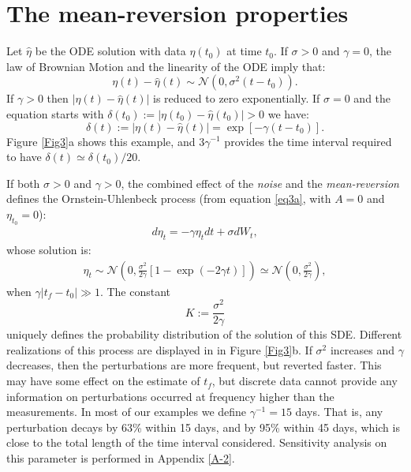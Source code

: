 \documentclass{article}
\begin{document}
\section{The mean-reversion properties}
Let $\hat\eta$ be the ODE solution with data $\eta(t_0)$ at time $t_0$. If $\sigma>0$ and $\gamma=0$, the law of Brownian Motion and the linearity of the ODE imply that:
$$\eta(t)-\hat\eta(t)\sim \mathcal N\left(0,\sigma^2(t-t_0)\right).$$
If $\gamma>0$ then $\left|\eta(t)-\hat\eta(t)\right|$ is reduced to zero exponentially. If $\sigma=0$ and the equation starts with $\delta(t_0):=|\eta(t_0)-\hat\eta(t_0)|>0$ we have:
$$\delta(t):=\left|\eta(t)-\hat\eta(t)\right|=\exp[-\gamma(t-t_0)].$$
Figure \ref{Fig3}a shows this example, and $3\gamma^{-1}$ provides the time interval required to have $\delta(t)\simeq\delta(t_0)/20$.

If both $\sigma>0$ and $\gamma>0$, the combined effect of the {\it noise} and the {\it mean-reversion} defines the Ornstein-Uhlenbeck process (from equation \ref{eq3a}, with $A=0$ and $\eta_{t_0}=0$):
\begin{align}\label{eq4a}
d\eta_t=-\gamma\eta_t dt+\sigma dW_t,
\end{align}
whose solution is:
\begin{align}\label{eq4b}
\eta_t\sim\mathcal N\left(0,\frac{\sigma^2}{2\gamma}\left[1-\exp(-2\gamma t)\right]\right)\simeq \mathcal N\left(0,\frac{\sigma^2}{2\gamma}\right),
\end{align}
when $\gamma|t_f-t_0|\gg1$. The constant
$$K:=\frac{\sigma^2}{2\gamma}$$
uniquely defines the probability distribution of the solution of this SDE. Different realizations of this process are displayed in in Figure \ref{Fig3}b. If $\sigma^2$ increases and $\gamma$ decreases, then the perturbations are more frequent, but reverted faster. This may have some effect on the estimate of $t_f$, but discrete data cannot provide any information on perturbations occurred at frequency higher than the measurements. In most of our examples we define $\gamma^{-1}=15$ days. That is, any perturbation decays by 63\% within 15 days, and by 95\% within 45 days, which is close to the total length of the time interval considered. Sensitivity analysis on this parameter is performed in Appendix \ref{A-2}.
\end{document}
